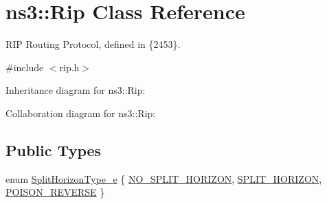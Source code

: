\hypertarget{classns3_1_1Rip}{}\section{ns3\+:\+:Rip Class Reference}
\label{classns3_1_1Rip}


R\+IP Routing Protocol, defined in \{2453\}.  




{\ttfamily \#include $<$rip.\+h$>$}



Inheritance diagram for ns3\+:\+:Rip\+:


Collaboration diagram for ns3\+:\+:Rip\+:
\subsection*{Public Types}
\begin{DoxyCompactItemize}
\item 
enum \hyperlink{classns3_1_1Rip_aa65e80d926399a90bc81b30dfc9404a4}{Split\+Horizon\+Type\+\_\+e} \{ \hyperlink{classns3_1_1Rip_aa65e80d926399a90bc81b30dfc9404a4a7444cea8e684dd1431a925f01eedfd03}{N\+O\+\_\+\+S\+P\+L\+I\+T\+\_\+\+H\+O\+R\+I\+Z\+ON}, 
\hyperlink{classns3_1_1Rip_aa65e80d926399a90bc81b30dfc9404a4a37e78b48a284b4248a999e281e8ea5f9}{S\+P\+L\+I\+T\+\_\+\+H\+O\+R\+I\+Z\+ON}, 
\hyperlink{classns3_1_1Rip_aa65e80d926399a90bc81b30dfc9404a4ad6573915007f19810b223a280519eb86}{P\+O\+I\+S\+O\+N\+\_\+\+R\+E\+V\+E\+R\+SE}
 \}
\end{DoxyCompactItemize}
